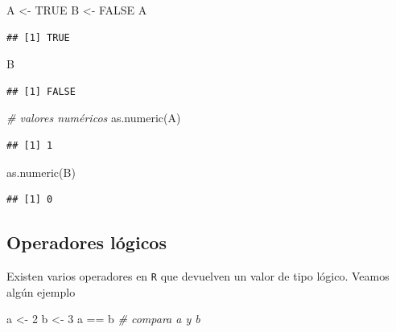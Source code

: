 \documentclass[
]{book}
\newenvironment{Shaded}{\begin{snugshade}}{\end{snugshade}}
\newcommand{\CommentTok}[1]{\textcolor[rgb]{0.56,0.35,0.01}{\textit{#1}}}
\newcommand{\ConstantTok}[1]{\textcolor[rgb]{0.00,0.00,0.00}{#1}}
\newcommand{\DecValTok}[1]{\textcolor[rgb]{0.00,0.00,0.81}{#1}}
\newcommand{\FunctionTok}[1]{\textcolor[rgb]{0.00,0.00,0.00}{#1}}
\newcommand{\NormalTok}[1]{#1}
\newcommand{\OtherTok}[1]{\textcolor[rgb]{0.56,0.35,0.01}{#1}}
\newcommand{\SpecialCharTok}[1]{\textcolor[rgb]{0.00,0.00,0.00}{#1}}
\theoremstyle{break}
\begin{document}
\begin{Shaded}
\begin{Highlighting}[]
\NormalTok{A }\OtherTok{\textless{}{-}} \ConstantTok{TRUE}
\NormalTok{B }\OtherTok{\textless{}{-}} \ConstantTok{FALSE}
\NormalTok{A}
\end{Highlighting}
\end{Shaded}

\begin{verbatim}
## [1] TRUE
\end{verbatim}

\begin{Shaded}
\begin{Highlighting}[]
\NormalTok{B}
\end{Highlighting}
\end{Shaded}

\begin{verbatim}
## [1] FALSE
\end{verbatim}

\begin{Shaded}
\begin{Highlighting}[]
\CommentTok{\# valores numéricos}
\FunctionTok{as.numeric}\NormalTok{(A)}
\end{Highlighting}
\end{Shaded}

\begin{verbatim}
## [1] 1
\end{verbatim}

\begin{Shaded}
\begin{Highlighting}[]
\FunctionTok{as.numeric}\NormalTok{(B)}
\end{Highlighting}
\end{Shaded}

\begin{verbatim}
## [1] 0
\end{verbatim}

\hypertarget{operadores-luxf3gicos}{%
\subsection{Operadores lógicos}\label{operadores-luxf3gicos}}

Existen varios operadores en
\texttt{R} que devuelven un valor de tipo lógico. Veamos algún ejemplo

\begin{Shaded}
\begin{Highlighting}[]
\NormalTok{a }\OtherTok{\textless{}{-}} \DecValTok{2}
\NormalTok{b }\OtherTok{\textless{}{-}} \DecValTok{3}
\NormalTok{a }\SpecialCharTok{==}\NormalTok{ b  }\CommentTok{\# compara a y b}
\end{Highlighting}
\end{Shaded}
\end{document}
